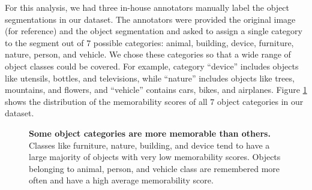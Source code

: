 For this analysis, we had three in-house annotators manually label the
object segmentations in our dataset. The annotators were provided the
original image (for reference) and the object segmentation and asked
to assign a single category to the segment out of $7$ possible
categories: animal, building, device, furniture, nature, person, and
vehicle. We chose these categories so that a wide range of object
classes could be covered. For example, category ``device'' includes
objects like utensils, bottles, and televisions, while ``nature'' includes objects like trees, mountains, and flowers, and “vehicle” contains cars, bikes, and airplanes. Figure \ref{fig:avgMem} shows the distribution of the memorability scores of all $7$ object categories in our dataset.

\begin{figure}[!htb]
\centering
{}
\vspace{-5mm}\caption{\footnotesize\textbf{Some object categories are more memorable than others.} Classes like furniture, nature, building, and device tend to have a large majority of objects with very low memorability scores. Objects belonging to animal, person, and vehicle class are remembered more often and have a high average memorability score.}\label{fig:avgMem}
\end{figure}

